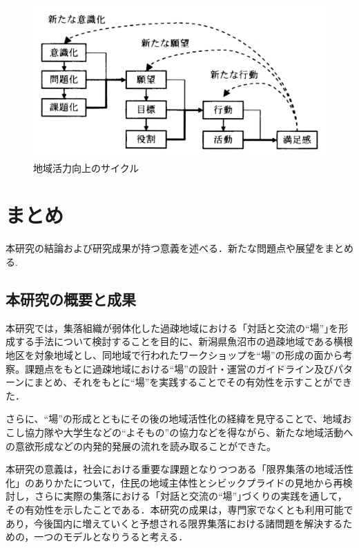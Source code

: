 \documentclass[a4paper]{jsarticle}
\begin{document}
\begin{figure}[H]
  \begin{center}
    \includegraphics[width=0.8\hsize]{./images/16.jpg}
    \caption{地域活力向上のサイクル
  }
    \label{fig:tmu_hino}
  \end{center}
\end{figure}

\newpage
\section{まとめ}
本研究の結論および研究成果が持つ意義を述べる．新たな問題点や展望をまとめる.

\subsection{本研究の概要と成果}

本研究では，集落組織が弱体化した過疎地域における「対話と交流の“場”｣を形成する手法について検討することを目的に、新潟県魚沼市の過疎地域である横根地区を対象地域とし、同地域で行われたワークショップを“場”の形成の面から考察。課題点をもとに過疎地域における“場”の設計・運営のガイドライン及びパターンにまとめ、それをもとに“場”を実践することでその有効性を示すことができた．\par
さらに、“場”の形成とともにその後の地域活性化の経緯を見守ることで、地域おこし協力隊や大学生などの“よそもの”の協力などを得ながら、新たな地域活動への意欲形成などの内発的発展の流れを読み取ることができた。\par
本研究の意義は，社会における重要な課題となりつつある「限界集落の地域活性化」のありかたについて，住民の地域主体性とシビックプライドの見地から再検討し，さらに実際の集落における「対話と交流の“場”｣づくりの実践を通して，その有効性を示したことである．本研究の成果は，専門家でなくとも利用可能であり，今後国内に増えていくと予想される限界集落における諸問題を解決するための，一つのモデルとなりうると考える．
\end{document}
